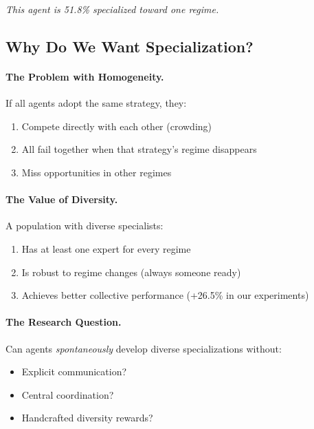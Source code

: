 \textit{This agent is 51.8\% specialized toward one regime.}


\subsection{Why Do We Want Specialization?}

\paragraph{The Problem with Homogeneity.} If all agents adopt the same strategy, they:
\begin{enumerate}
    \item Compete directly with each other (crowding)
    \item All fail together when that strategy's regime disappears
    \item Miss opportunities in other regimes
\end{enumerate}

\paragraph{The Value of Diversity.} A population with diverse specialists:
\begin{enumerate}
    \item Has at least one expert for every regime
    \item Is robust to regime changes (always someone ready)
    \item Achieves better collective performance (+26.5\% in our experiments)
\end{enumerate}

\paragraph{The Research Question.} Can agents \textit{spontaneously} develop diverse specializations without:
\begin{itemize}
    \item Explicit communication?
    \item Central coordination?
    \item Handcrafted diversity rewards?
\end{itemize}

